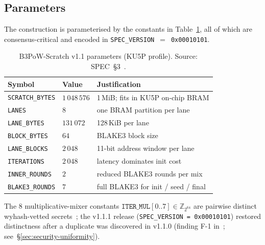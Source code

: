 \documentclass[11pt,a4paper]{article}
\theoremstyle{plain}
\theoremstyle{definition}
\theoremstyle{remark}
\begin{document}
\subsection{Parameters}\label{sec:algo-params}

The construction is parameterised by the constants in
Table~\ref{tab:params}, all of which are consensus-critical and
encoded in \texttt{SPEC\_VERSION}~$=$~\texttt{0x00010101}.

\begin{table}[t]
\centering
\caption{B3PoW-Scratch v1.1 parameters (KU5P profile). Source:
         SPEC~\S3~\cite{b3chain-spec}.}
\label{tab:params}
\begin{tabular}{lll}
\toprule
Symbol & Value & Justification \\
\midrule
\texttt{SCRATCH\_BYTES}  & $1\,048\,576$        & 1\,MiB; fits in
                                                 KU5P on-chip BRAM \\
\texttt{LANES}           & $8$                  & one BRAM partition
                                                 per lane \\
\texttt{LANE\_BYTES}     & $131\,072$           & 128\,KiB per lane \\
\texttt{BLOCK\_BYTES}    & $64$                 & BLAKE3 block size \\
\texttt{LANE\_BLOCKS}    & $2\,048$             & 11-bit address window
                                                 per lane \\
\texttt{ITERATIONS}      & $2\,048$             & latency dominates
                                                 init cost \\
\texttt{INNER\_ROUNDS}   & $2$                  & reduced BLAKE3
                                                 rounds per mix \\
\texttt{BLAKE3\_ROUNDS}  & $7$                  & full BLAKE3 for
                                                 init / seed / final \\
\bottomrule
\end{tabular}
\end{table}

The 8 multiplicative-mixer constants
$\texttt{ITER\_MUL}[0..7]\in\mathbb{Z}_{2^{64}}$ are pairwise distinct
wyhash-vetted secrets~\cite{wyhash}; the v1.1.1 release
(\texttt{SPEC\_VERSION = 0x00010101}) restored distinctness after a
duplicate was discovered in v1.1.0 (finding F-1
in~\cite{b3chain-51attack}; see~\S\ref{sec:security-uniformity}).
\end{document}
